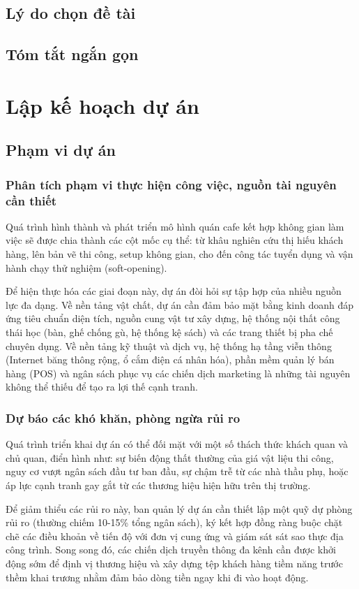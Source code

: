 \documentclass[a4paper,12pt]{article}
\begin{document}
\subsection{Lý do chọn đề tài}
\subsection{Tóm tắt ngắn gọn}

\section{Lập kế hoạch dự án}
\subsection{Phạm vi dự án}
\subsubsection{Phân tích phạm vi thực hiện công việc, nguồn tài nguyên cần thiết}
Quá trình hình thành và phát triển mô hình quán cafe kết hợp không gian làm việc sẽ được chia thành các cột mốc cụ thể: từ khâu nghiên cứu thị hiếu khách hàng, lên bản vẽ thi công, setup không gian, cho đến công tác tuyển dụng và vận hành chạy thử nghiệm (soft-opening).

Để hiện thực hóa các giai đoạn này, dự án đòi hỏi sự tập hợp của nhiều nguồn lực đa dạng. Về nền tảng vật chất, dự án cần đảm bảo mặt bằng kinh doanh đáp ứng tiêu chuẩn diện tích, nguồn cung vật tư xây dựng, hệ thống nội thất công thái học (bàn, ghế chống gù, hệ thống kệ sách) và các trang thiết bị pha chế chuyên dụng. Về nền tảng kỹ thuật và dịch vụ, hệ thống hạ tầng viễn thông (Internet băng thông rộng, ổ cắm điện cá nhân hóa), phần mềm quản lý bán hàng (POS) và ngân sách phục vụ các chiến dịch marketing là những tài nguyên không thể thiếu để tạo ra lợi thế cạnh tranh.
\subsubsection{Dự báo các khó khăn, phòng ngừa rủi ro}
Quá trình triển khai dự án có thể đối mặt với một số thách thức khách quan và chủ quan, điển hình như: sự biến động thất thường của giá vật liệu thi công, nguy cơ vượt ngân sách đầu tư ban đầu, sự chậm trễ từ các nhà thầu phụ, hoặc áp lực cạnh tranh gay gắt từ các thương hiệu hiện hữu trên thị trường.

Để giảm thiểu các rủi ro này, ban quản lý dự án cần thiết lập một quỹ dự phòng rủi ro (thường chiếm 10-15\% tổng ngân sách), ký kết hợp đồng ràng buộc chặt chẽ các điều khoản về tiến độ với đơn vị cung ứng và giám sát sát sao thực địa công trình. Song song đó, các chiến dịch truyền thông đa kênh cần được khởi động sớm để định vị thương hiệu và xây dựng tệp khách hàng tiềm năng trước thềm khai trương nhằm đảm bảo dòng tiền ngay khi đi vào hoạt động.
\end{document}
